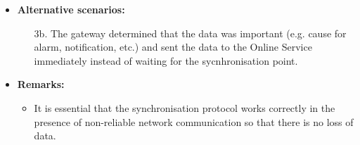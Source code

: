\begin{itemize}
    \item \textbf{Alternative scenarios:}
        \begin{enumerate}
            \item [3b.] The gateway determined that the data was important
                  (e.g. cause for alarm, notification, etc.) and sent the data
                  to the Online Service immediately instead of waiting for the
                  sycnhronisation point.
        \end{enumerate}

    \item \textbf{Remarks:}
        \begin{itemize}
            \item It is essential that the synchronisation protocol works
                  correctly in the presence of non-reliable network communication
                  so that there is no loss of data.
        \end{itemize}
\end{itemize}

